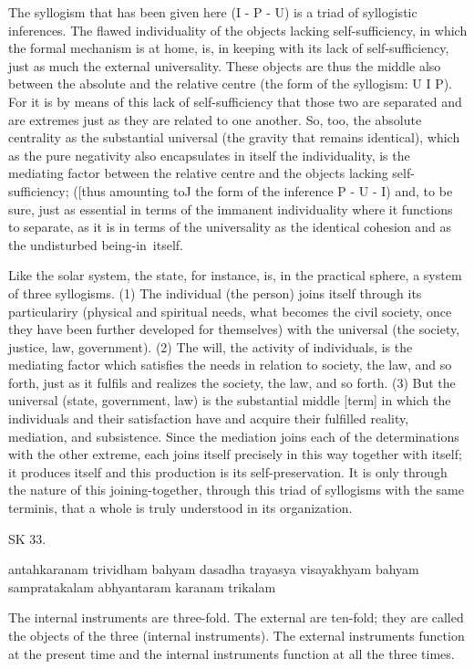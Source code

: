 The syllogism that has been given here (I - P - U) is
a triad of syllogistic inferences.
The flawed individuality of the objects lacking self-sufficiency,
in which the formal mechanism is at home, is, in keeping with its lack
of self-sufficiency, just as much the external universality.
These objects are thus the middle also between the absolute and
the relative centre (the form of the syllogism: U I P).
For it is by means of this lack of self-sufficiency
that those two are separated and are extremes
just as they are related to one another.
So, too, the absolute centrality as the substantial universal
(the gravity that remains identical),
which as the pure negativity also encapsulates in itself the individuality,
is the mediating factor between the relative centre
and the objects lacking self-sufficiency;
([thus amounting toJ the form of the inference P - U - I)
and, to be sure, just as essential in terms of the immanent individuality
where it functions to separate, as it is in terms of the universality
as the identical cohesion and as the undisturbed being-in~itself.

    Like the solar system, the state, for instance, is, in the practical
    sphere, a system of three syllogisms.
    (1) The individual (the person) joins itself through its particulariry
    (physical and spiritual needs, what becomes the civil society,
    once they have been further developed for themselves)
    with the universal (the society, justice, law, government).
    (2) The will, the activity of individuals, is the mediating factor
    which satisfies the needs in relation to society, the law, and so forth,
    just as it fulfils and realizes the society, the law, and so forth.
    (3) But the universal (state, government, law) is the substantial
    middle [term] in which the individuals and their satisfaction have and
    acquire their fulfilled reality, mediation, and subsistence.
    Since the mediation joins each of the determinations with the other extreme,
    each joins itself precisely in this way together with itself;
    it produces itself and this production is its self-preservation.
    It is only through the nature of this joining-together,
    through this triad of syllogisms with the same terminis,
    that a whole is truly understood in its organization.

SK 33.

antahkaranam trividham bahyam dasadha trayasya visayakhyam
bahyam sampratakalam abhyantaram karanam trikalam

The internal instruments are three-fold.
The external are ten-fold; they are called the objects of the three (internal instruments).
The external instruments function at the present time and
the internal instruments function at all the three times.

